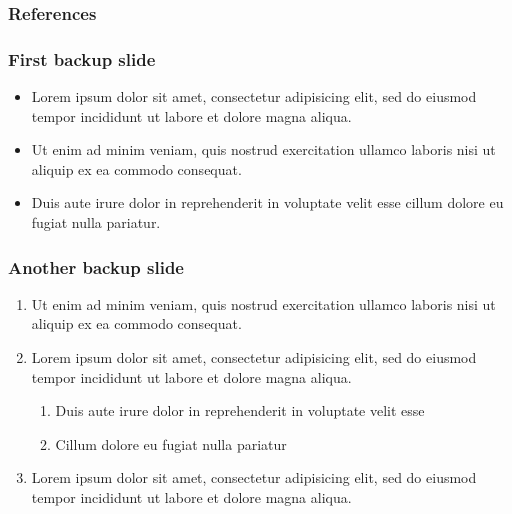 \expandafter\documentclass\expandafter[\presentationclassoptions]{beamer}
\begin{document}
\begin{frame}[allowframebreaks=0.8]
  \frametitle{References}
  \footnotesize
  \printbibliography[heading=none]
\end{frame}

\lastslide

\begin{frame}[label=backupSlide]
  \frametitle{First backup slide}
  \begin{itemize}
    \item Lorem ipsum dolor sit amet, consectetur adipisicing elit, sed do eiusmod
      tempor incididunt ut labore et dolore magna aliqua.
    \item  Ut enim ad minim veniam, quis nostrud exercitation ullamco laboris nisi ut aliquip ex ea commodo consequat.
    \item Duis aute irure dolor in reprehenderit in voluptate velit esse
      cillum dolore eu fugiat nulla pariatur.
  \end{itemize}
  \hyperlink{firstSlide}{}
\end{frame}

\begin{frame}[label=anotherBackupSlide]
  \frametitle{Another backup slide}
  \begin{enumerate}
    \item  Ut enim ad minim veniam, quis nostrud exercitation ullamco laboris nisi ut aliquip ex ea commodo consequat.
    \item Lorem ipsum dolor sit amet, consectetur adipisicing elit, sed do eiusmod
      tempor incididunt ut labore et dolore magna aliqua.
      \begin{enumerate}
        \item Duis aute irure dolor in reprehenderit in voluptate velit esse
        \item Cillum dolore eu fugiat nulla pariatur
      \end{enumerate}
    \item Lorem ipsum dolor sit amet, consectetur adipisicing elit, sed do eiusmod
      tempor incididunt ut labore et dolore magna aliqua.
  \end{enumerate}
  \hyperlink{firstSlide}{}
\end{frame}
\end{document}
